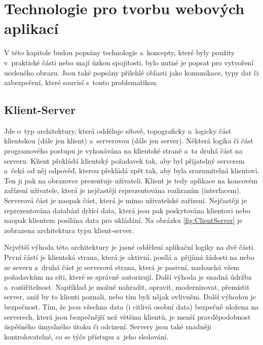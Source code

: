 \section{Technologie pro tvorbu webových aplikací}

V této kapitole budou popsány technologie a~koncepty, které byly použity v~praktické části nebo mají úzkou spojitosti, bylo nutné je popsat pro vytvoření uceleného obrazu. Jsou také popsány přilehlé oblasti jako komunikace, typy dat či zabezpečení, které souvisí s~touto problematikou.

\subsection{Klient-Server}
\label{sec:KlientServer}

Jde o~typ architektury, která odděluje síťově, topograficky a~logicky část klientskou (dále jen klient) a~serverovou (dále jen server). Některá logika či část programového postupu je vykonávána na klientské straně a~ta druhá část na serveru. Klient překládá klientský požadavek tak, aby byl přijatelný serverem a~čeká od něj odpověď, kterou překládá zpět tak, aby byla srozumitelná klientovi. Ten ji pak na obrazovce prezentuje uživateli. Klient je tedy aplikace na koncovém zařízení uživatele, která je nejčastěji reprezentována rozhraním (interfacem). Serverová část je naopak část, která je mimo uživatelské zařízení. Nejčastěji je reprezentována databází držící data, která jsou pak poskytována klientovi nebo naopak klientem posílána data pro ukládání. Na obrázku \ref{fig:ClientServer} je zobrazena architektura typu klient-server.\cite{1}\\
 

Největší výhoda této architektury je jasné oddělení aplikační logiky na dvě části. První částí je klientská strana, která je aktivní, posílá a~přijímá žádosti na nebo ze severu a~druhá část je serverová strana, která je pasivní, naslouchá všem požadavkům na síti, které se správně autorizují. Další výhoda je snadná údržba a~rozšiřitelnost. Například je možné nahradit, opravit, modernizovat, přemístit server, aniž by to klienti poznali, nebo tím byli nějak ovlivněni. Další výhodou je bezpečnost. Tím, že jsou všechna data (i citlivá osobní data) bezpečně uložena na serverech, která jsou bezpečnější než většina klientů, je menší pravděpodobnost úspěšného úmyslného útoku či odcizení. Servery jsou také snadněji kontrolovatelné, co se týče přístupu a~jeho sledování. \\
 
